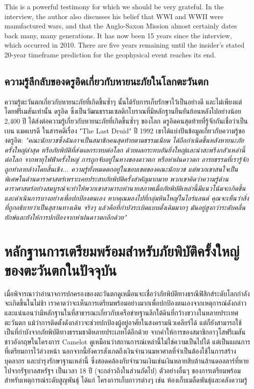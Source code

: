 \documentclass[10pt,twocolumn,letterpaper]{article}
\begin{document}
This is a powerful testimony for which we should be very grateful. In the interview, the author also discusses his belief that WWI and WWII were manufactured wars, and that the Anglo-Saxon Mission almost certainly dates back many, many generations. It has now been 15 years since the interview, which occurred in 2010. There are five years remaining until the insider's stated 20-year timeframe prediction for the geophysical event reaches its end.
\subsection{ความรู้ลึกลับของดรูอิดเกี่ยวกับหายนะภัยในโลกตะวันตก}

ความรู้ตะวันตกเกี่ยวกับหายนะภัยที่เกิดขึ้นซ้ำๆ นั้นได้รับการเก็บรักษาไว้เป็นอย่างดี และไม่เพียงแต่โดยฟรีเมสันเท่านั้น ดรูอิด ซึ่งเป็นวัฒนธรรมเซลติกโบราณที่มีหลักฐานยืนยันย้อนหลังไปอย่างน้อย 2,400 ปี \cite{7} ได้ส่งต่อความรู้เกี่ยวกับหายนะภัยที่เกิดขึ้นซ้ำๆ ของโลก ดรูอิดคนสุดท้ายที่รู้จักกันเชื่อว่าเป็นเบน แมคเบรดี ในสารคดีเรื่อง "The Last Druid" ปี 1992 เขาได้แบ่งปันข้อมูลเกี่ยวกับความรู้ของดรูอิด: \textit{"คณะนักบวชซึ่งฉันอาจเป็นสมาชิกคนสุดท้ายตามธรรมเนียม ได้ถือกำเนิดขึ้นหลังหายนะภัยครั้งใหญ่ล่าสุด หรือภัยพิบัติที่ส่งผลกระทบต่อโลก ด้วยผลกระทบอันยิ่งใหญ่และน่าสะพรึงกลัวเหล่านี้ต่อโลก จากพายุไฟฟ้าครั้งใหญ่ การถูกจับอยู่ในหางของดาวตก หรือห่าฝนดาวตก อารยธรรมที่เรารู้จักถูกทำลายล้างโดยสิ้นเชิง... ความรู้ทั้งหมดตกอยู่ในขอบเขตของคณะนักบวช แต่พวกเขาสนใจเป็นพิเศษในด้านดาราศาสตร์เพราะเคยประสบภัยพิบัติครั้งสำคัญมากมาย พวกเขาคิดว่าความรู้ด้านดาราศาสตร์อย่างสมบูรณ์จะทำให้พวกเขาสามารถทำนายสภาพเมื่อภัยพิบัติเหล่านี้มีแนวโน้มจะเกิดขึ้นและดำเนินการบางอย่างเพื่อปกป้องตนเอง หากคุณมองไปที่กลุ่มหินใหญ่ในไอร์แลนด์ คุณจะเห็นว่าสิ่งที่ถูกอธิบายว่าเป็นสุสานทางเดิน จริงๆ แล้วคือที่กำบังระเบิดแบบดั้งเดิมมากๆ มันอยู่สูงกว่าระดับคลื่นยักษ์และยังให้การปกป้องจากห่าฝนดาวตกอีกด้วย"} \cite{8,9}

\section{หลักฐานการเตรียมพร้อมสำหรับภัยพิบัติครั้งใหญ่ของตะวันตกในปัจจุบัน}

เมื่อพิจารณาว่าอำนาจการปกครองของตะวันตกดูเหมือนจะเชื่อว่าภัยพิบัติทางธรณีฟิสิกส์ระดับโลกกำลังจะเกิดขึ้นในไม่ช้า เราคาดว่าจะเห็นการเตรียมพร้อมอย่างมากเพื่อปกป้องตนเองจากเหตุการณ์ดังกล่าว และแน่นอนว่ามีหลักฐานในที่สาธารณะเกี่ยวกับเครือข่ายฐานลึกใต้ดินที่กว้างขวางในหลายประเทศตะวันตก แม้ว่าการติดตั้งดังกล่าวจะช่วยปกป้องผู้อยู่อาศัยในสงครามนิวเคลียร์ได้ แต่ก็ยังสามารถใช้เป็นที่กำบังจากภัยพิบัติทางธรรมชาติหลายประเภทได้อีกด้วย จากคำให้การของสมาชิกอาวุโสฟรีเมสันชาวอังกฤษในโครงการ Camelot \cite{4,6} ดูเหมือนว่าสถานการณ์เหล่านี้ไม่ใช่ความเป็นไปได้ แต่เป็นแผนการที่เตรียมการไว้ล่วงหน้า นอกจากนี้ยังควรสังเกตถึงเงินจำนวนมหาศาลที่จำเป็นต้องใช้ในการสร้าง บุคลากร และบำรุงรักษาฐานเหล่านี้ ซึ่งสอดคล้องกับจำนวนเงินเช่นเงินหลายสิบล้านล้านดอลลาร์ที่หายไปจากรัฐบาลสหรัฐฯ เป็นเวลา 18 ปี (จะกล่าวถึงในส่วนถัดไป) \cite{11,12,13} ตัวอย่างอื่นๆ ของการเตรียมพร้อมสำหรับเหตุการณ์ระดับสูญพันธุ์ ได้แก่ โครงการเก็บถาวรต่างๆ เช่น ห้องเก็บเมล็ดพันธุ์และคลังความรู้
\end{document}
